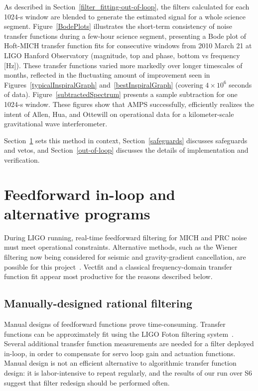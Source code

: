 As described in Section~\ref{filter_fitting-out-of-loop}, the filters calculated for each 1024-s window are blended to generate the estimated signal for a whole science segment. Figure~\ref{BodePlots} illustrates the short-term consistency of noise transfer functions during a few-hour science segment, presenting a Bode plot of Hoft-MICH transfer function fits for consecutive windows from 2010 March 21 at LIGO Hanford Observatory (magnitude, top and phase, bottom vs frequency [Hz]). These transfer functions varied more markedly over longer timescales of months, reflected in the fluctuating amount of improvement seen in Figures~\ref{typicalInspiralGraph} and~\ref{bestInspiralGraph} (covering $4\times10^6$ seconds of data). Figure~\ref{subtractedSpectrum} presents a sample subtraction for one 1024-s window. These figures show that AMPS successfully, efficiently realizes the intent of Allen, Hua, and Ottewill on operational data for a kilometer-scale gravitational wave interferometer.

Section~\ref{prior_programs} sets this method in context, Section~\ref{safeguards} discusses safeguards and vetos, and Section~\ref{out-of-loop} discusses the details of implementation and verification.



    \section{Feedforward in-loop and alternative programs}
    \label{prior_programs}
   
        During LIGO running, real-time feedforward filtering for MICH and PRC noise must meet operational constraints. Alternative methods, such as the Wiener filtering now being considered for seismic and gravity-gradient cancellation, are possible for this project~\cite{Driggers2012ActiveNoise}. Vectfit and a classical frequency-domain transfer function fit appear most productive for the reasons described below.
        
        \subsection{Manually-designed rational filtering}
        \label{manual_design}

            Manual designs of feedforward functions prove time-consuming. Transfer functions can be approximately fit using the LIGO Foton filtering system~\cite{Sigg2005}. Several additional transfer function measurements are needed for a filter deployed in-loop, in order to compensate for servo loop gain and actuation functions. Manual design is not an efficient alternative to algorithmic transfer function design: it is labor-intensive to repeat regularly, and the results of our run over S6 suggest that filter redesign should be performed often.

